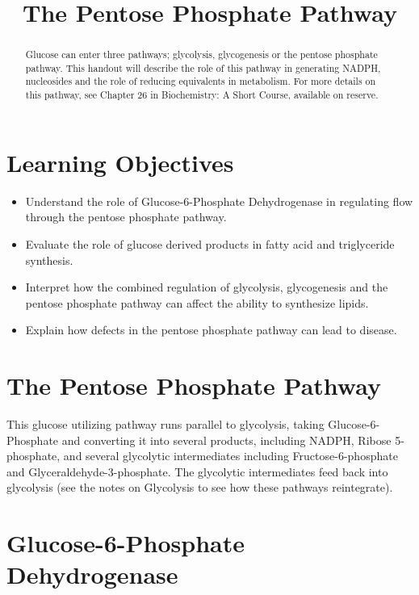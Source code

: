 \documentclass{tufte-handout}
\title{The Pentose Phosphate Pathway}
\author{}
\date{}  %
\begin{document}
\maketitle%

\begin{abstract}
\noindent Glucose can enter three pathways; glycolysis, glycogenesis or the pentose phosphate pathway.  This handout will describe the role of this pathway in generating NADPH, nucleosides and the role of reducing equivalents in metabolism.   For more details on this pathway, see Chapter 26 in Biochemistry: A Short Course, available on reserve\cite{Berg2015}.
\end{abstract}

\tableofcontents
\pagebreak
\section{Learning Objectives}

\begin{itemize}
\item Understand the role of Glucose-6-Phosphate Dehydrogenase in regulating flow through the pentose phosphate pathway.
\item Evaluate the role of glucose derived products in fatty acid and triglyceride synthesis.
\item Interpret how the combined regulation of glycolysis, glycogenesis and the pentose phosphate pathway can affect the ability to synthesize lipids.
\item Explain how defects in the pentose phosphate pathway can lead to disease.
\end{itemize}

\section{The Pentose Phosphate Pathway}

This glucose utilizing pathway runs parallel to glycolysis, taking Glucose-6-Phosphate and converting it into several products, including NADPH, Ribose 5-phosphate, and several glycolytic intermediates including Fructose-6-phosphate and Glyceraldehyde-3-phosphate.  The glycolytic intermediates feed back into glycolysis (see the notes on Glycolysis to see how these pathways reintegrate).

\section{Glucose-6-Phosphate Dehydrogenase}
\end{document}
